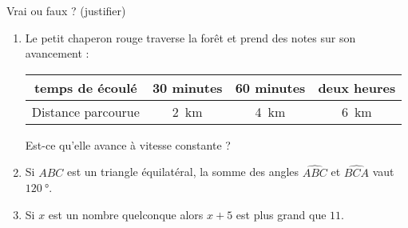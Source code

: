 
\begin{exercice}\label{exo2smath-0251}

    Vrai ou faux ? (justifier)
    \begin{enumerate}
        \item
            Le petit chaperon rouge traverse la forêt et prend des notes sur son avancement :
            \begin{center}
                \begin{tabular}[]{|c||c|c|c|}
                    \hline
                    temps de écoulé&30 minutes&60 minutes&deux heures\\
                    \hline
                    Distance parcourue&\SI{2}{\kilo\meter}&\SI{4}{\kilo\meter}&\SI{6}{\kilo\meter}\\ 
                    \hline
                \end{tabular}
            \end{center}
                Est-ce qu'elle avance à vitesse constante ?
        \item
            Si \( ABC\) est un triangle équilatéral, la somme des angles \( \widehat{ABC}\) et \( \widehat{BCA}\) vaut \(\SI{120}{\degree}\).
        \item
            Si \( x\) est un nombre quelconque alors \( x+5\) est plus grand que \( 11\).
    \end{enumerate}

\end{exercice}
